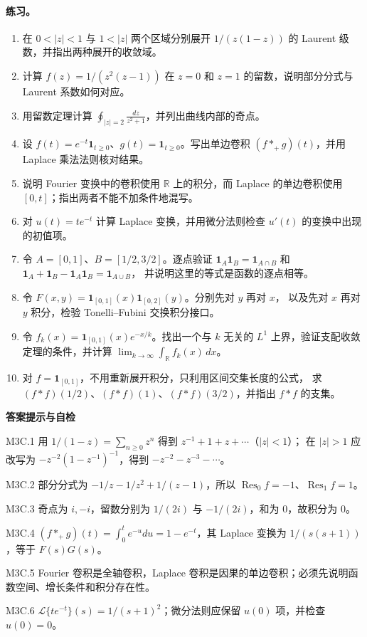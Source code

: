 \documentclass[UTF8,fontset=none,a4paper,11pt]{ctexart}
\theoremstyle{foundation-definition}
\theoremstyle{foundation-theorem}
\theoremstyle{foundation-proposition}
\theoremstyle{foundation-example}
\theoremstyle{foundation-remark}
\theoremstyle{foundation-theorem}
\newenvironment{answerkey}{%
\begin{mdframed}[backgroundcolor=examplebg,linecolor=examplepurple,linewidth=1.0pt,
  leftline=true,rightline=false,topline=false,bottomline=false,
  skipabove=7pt,skipbelow=8pt,innerleftmargin=10pt,innerrightmargin=8pt,
  innertopmargin=6pt,innerbottommargin=6pt]
{\sffamily\bfseries\color{examplepurple}答案提示与自检}\par\smallskip\small
}{\end{mdframed}}
\begin{document}
\paragraph{练习。}
\begin{enumerate}[label=M3C.\arabic*.]
  \item 在 \(0<|z|<1\) 与 \(1<|z|\) 两个区域分别展开
    \(1/(z(1-z))\) 的 Laurent 级数，并指出两种展开的收敛域。
  \item 计算 \(f(z)=1/(z^2(z-1))\) 在 \(z=0\) 和 \(z=1\) 的留数，说明部分分式与 Laurent 系数如何对应。
  \item 用留数定理计算
    \(\displaystyle\oint_{|z|=2}\frac{dz}{z^2+1}\)，并列出曲线内部的奇点。
  \item 设 \(f(t)=e^{-t}\mathbf 1_{t\geq0}\)、\(g(t)=\mathbf 1_{t\geq0}\)。写出单边卷积
    \((f*_+g)(t)\)，并用 Laplace 乘法法则核对结果。
  \item 说明 Fourier 变换中的卷积使用 \(\mathbb R\) 上的积分，而 Laplace 的单边卷积使用 \([0,t]\)；指出两者不能不加条件地混写。
  \item 对 \(u(t)=t e^{-t}\) 计算 Laplace 变换，并用微分法则检查 \(u'(t)\) 的变换中出现的初值项。
  \item 令 \(A=[0,1]\)、\(B=[1/2,3/2]\)。逐点验证
    \(\mathbf 1_A\mathbf 1_B=\mathbf 1_{A\cap B}\) 和
    \(\mathbf 1_A+\mathbf 1_B-\mathbf 1_A\mathbf 1_B=\mathbf 1_{A\cup B}\)，
    并说明这里的等式是函数的逐点相等。
  \item 令
    \(F(x,y)=\mathbf 1_{[0,1]}(x)\mathbf 1_{[0,2]}(y)\)。分别先对 \(y\) 再对 \(x\)，
    以及先对 \(x\) 再对 \(y\) 积分，检验 Tonelli--Fubini 交换积分接口。
  \item 令
    \(f_k(x)=\mathbf 1_{[0,1]}(x)e^{-x/k}\)。找出一个与 \(k\) 无关的
    \(L^1\) 上界，验证支配收敛定理的条件，并计算
    \(\lim_{k\to\infty}\int_{\mathbb R}f_k(x)\,dx\)。
  \item 对 \(f=\mathbf 1_{[0,1]}\)，不用重新展开积分，只利用区间交集长度的公式，
    求 \((f*f)(1/2)\)、\((f*f)(1)\)、\((f*f)(3/2)\)，并指出 \(f*f\) 的支集。
\end{enumerate}

\begin{answerkey}
M3C.1 用 \(1/(1-z)=\sum_{n\geq0}z^n\) 得到 \(z^{-1}+1+z+\cdots\)（\(|z|<1\)）；
在 \(|z|>1\) 应改写为 \(-z^{-2}(1-z^{-1})^{-1}\)，得到 \(-z^{-2}-z^{-3}-\cdots\)。\par
M3C.2 部分分式为 \(-1/z-1/z^2+1/(z-1)\)，所以 \(\operatorname{Res}_{0}f=-1\)、\(\operatorname{Res}_{1}f=1\)。\par
M3C.3 奇点为 \(i,-i\)，留数分别为 \(1/(2i)\) 与 \(-1/(2i)\)，和为 \(0\)，故积分为 \(0\)。\par
M3C.4 \((f*_+g)(t)=\int_0^t e^{-u}du=1-e^{-t}\)，其 Laplace 变换为
  \(1/(s(s+1))\)，等于 \(F(s)G(s)\)。\par
M3C.5 Fourier 卷积是全轴卷积，Laplace 卷积是因果的单边卷积；必须先说明函数空间、增长条件和积分存在性。\par
M3C.6 \(\mathcal L\{te^{-t}\}(s)=1/(s+1)^2\)；微分法则应保留 \(u(0)\) 项，并检查 \(u(0)=0\)。\par
\end{answerkey}
\end{document}
